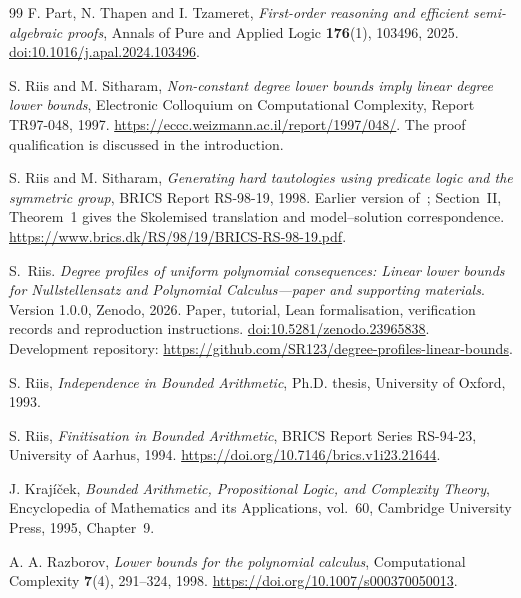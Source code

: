 \begin{thebibliography}{99}
F. Part, N. Thapen and I. Tzameret, \emph{First-order reasoning and
efficient semi-algebraic proofs}, Annals of Pure and Applied Logic
\textbf{176}(1), 103496, 2025.
\href{https://doi.org/10.1016/j.apal.2024.103496}{doi:10.1016/j.apal.2024.103496}.

S. Riis and M. Sitharam, \emph{Non-constant degree lower bounds imply
linear degree lower bounds}, Electronic Colloquium on Computational
Complexity, Report TR97-048, 1997.
\url{https://eccc.weizmann.ac.il/report/1997/048/}.
The proof qualification is discussed in the introduction.

S. Riis and M. Sitharam, \emph{Generating hard tautologies using predicate
logic and the symmetric group}, BRICS Report RS-98-19, 1998.
Earlier version of~\cite{RiisSitharamTautologies}; Section~II,
Theorem~1 gives the Skolemised translation and model--solution correspondence.
\url{https://www.brics.dk/RS/98/19/BRICS-RS-98-19.pdf}.

S.~Riis.
\emph{Degree profiles of uniform polynomial consequences: Linear lower
bounds for Nullstellensatz and Polynomial Calculus---paper and supporting materials}.
Version 1.0.0, Zenodo, 2026. Paper, tutorial, Lean formalisation,
verification records and reproduction instructions.
\href{https://doi.org/10.5281/zenodo.23965838}{doi:10.5281/zenodo.23965838}.
Development repository:
\url{https://github.com/SR123/degree-profiles-linear-bounds}.

S. Riis, \emph{Independence in Bounded Arithmetic},
Ph.D. thesis, University of Oxford, 1993.

S. Riis, \emph{Finitisation in Bounded Arithmetic},
BRICS Report Series RS-94-23, University of Aarhus, 1994.
\url{https://doi.org/10.7146/brics.v1i23.21644}.

J. Kraj\'{i}\v{c}ek, \emph{Bounded Arithmetic, Propositional Logic,
and Complexity Theory}, Encyclopedia of Mathematics and its Applications,
vol.~60, Cambridge University Press, 1995, Chapter~9.

A. A. Razborov, \emph{Lower bounds for the polynomial calculus},
Computational Complexity \textbf{7}(4), 291--324, 1998.
\url{https://doi.org/10.1007/s000370050013}.

\end{thebibliography}
